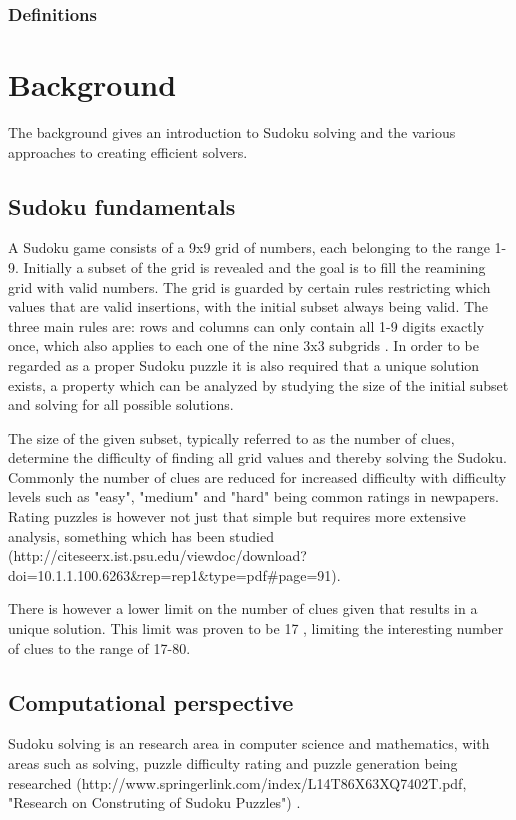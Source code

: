 \documentclass[a4paper,11pt]{kth-mag}
\begin{document}
\subsection{Definitions}

\chapter{Background}
The background gives an introduction to Sudoku solving and the various approaches to creating efficient solvers.

\FloatBarrier
\section{Sudoku fundamentals}
A Sudoku game consists of a 9x9 grid of numbers, each belonging to the range 1-9.
Initially a subset of the grid is revealed and the goal is to fill the reamining grid with valid numbers.
The grid is guarded by certain rules restricting which values that are valid insertions, with the initial subset always being valid.
The three main rules are: rows and columns can only contain all 1-9 digits exactly once, which also applies to each one of the nine 3x3 subgrids \cite{17clueProof}.
In order to be regarded as a proper Sudoku puzzle it is also required that a unique solution exists, a property which can be analyzed by studying the size of the initial subset and solving for all possible solutions.

The size of the given subset, typically referred to as the number of clues, determine the difficulty of finding all grid values and thereby solving the Sudoku.
Commonly the number of clues are reduced for increased difficulty with difficulty levels such as "easy", "medium" and "hard" being common ratings in newpapers.
Rating puzzles is however not just that simple but requires more extensive analysis, something which has been studied (http://citeseerx.ist.psu.edu/viewdoc/download?doi=10.1.1.100.6263\&rep=rep1\&type=pdf\#page=91).

There is however a lower limit on the number of clues given that results in a unique solution.
This limit was proven to be 17 \cite{17clueProof}, limiting the interesting number of clues to the range of 17-80.

\FloatBarrier
\section{Computational perspective}
Sudoku solving is an research area in computer science and mathematics, with areas such as solving, puzzle difficulty rating and puzzle generation being researched \cite{stochastic}(http://www.springerlink.com/index/L14T86X63XQ7402T.pdf, "Research on Construting of Sudoku Puzzles") \cite{generation}.
\end{document}
